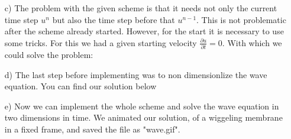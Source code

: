 \begin{itemize}
\begin{itemize}
        \FloatBarrier
        \item[c)]
        \FloatBarrier
        The problem with the given scheme is that it needs not only the current time step $u^{n}$ but also the time step before that $u^{n-1}$.
        This is not problematic after the scheme already started.
        However, for the start it is necessary to use some tricks.
        For this we had a given starting velocity $\frac{\partial u}{\partial t} = 0$.
        With which we could solve the problem:


        \FloatBarrier
        \item[d)]
        \FloatBarrier
        The last step before implementing was to non dimensionlize the wave equation.
        You can find our solution below 

        \FloatBarrier
        \item[e)]
        Now we can implement the whole scheme and solve the wave equation in two dimensions in time.
        We animated our solution, of a wiggeling membrane in a fixed frame, and saved the file as "wave.gif".

    \end{itemize}
\end{itemize}


